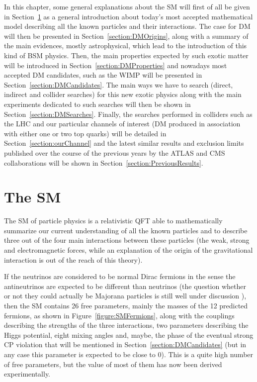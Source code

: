 \documentclass[a4paper, 10pt, openright]{report}
\begin{document}
In this chapter, some general explanations about the \ac{SM} will first of all be given in Section~\ref{section:SM} as a general introduction about today's most accepted mathematical model describing all the known particles and their interactions. The case for \ac{DM} will then be presented in Section~\ref{section:DMOrigins}, along with a summary of the main evidences, mostly astrophysical, which lead to the introduction of this kind of \acf{BSM} physics. Then, the main properties expected by such exotic matter will be introduced in Section~\ref{section:DMProperties} and nowadays most accepted \ac{DM} candidates, such as the \acf{WIMP} will be presented in Section~\ref{section:DMCandidates}. The main ways we have to search (direct, indirect and collider searches) for this new exotic physics along with the main experiments dedicated to such searches will then be shown in Section~\ref{section:DMSearches}. Finally, the searches performed in colliders such as the \ac{LHC} and our particular channels of interest (\ac{DM} produced in association with either one or two top quarks) will be detailed in Section~\ref{section:ourChannel} and the latest similar results and exclusion limits published over the course of the previous years by the \ac{ATLAS} and \ac{CMS} collaborations will be shown in Section~\ref{section:PreviousResults}.

\section{The \acf{SM}} \label{section:SM}

The \ac{SM} of particle physics is a relativistic \ac{QFT} able to  mathematically summarize our current understanding of all the known particles and to describe three out of the four main interactions between these particles (the weak, strong and electromagnetic forces, while an explanation of the origin of the gravitational interaction is out of the reach of this theory). 

If the neutrinos are considered to be normal Dirac fermions in the sense the antineutrinos are expected to be different than neutrinos (the question whether or not they could actually be Majorana particles is still well under discussion \cite{Majorana}), then the \ac{SM} contains 26 free parameters, mainly the masses of the 12 predicted fermions, as shown in Figure~\ref{figure:SMFermions}, along with the couplings describing the strengths of the three interactions, two parameters describing the Higgs potential, eight mixing angles and, maybe, the phase of the eventual strong CP violation that will be mentioned in Section~\ref{section:DMCandidates} (but in any case this parameter is expected to be close to 0). This is a quite high number of free parameters, but the value of most of them has now been derived experimentally.
\end{document}
